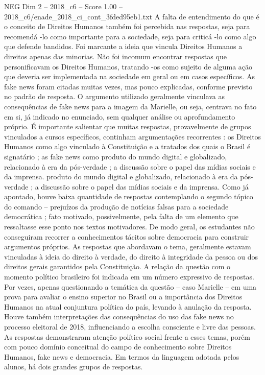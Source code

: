 \begin{textsample}{NEG Dim 2 – 2018\_c6 – Score 1.00 – 2018\_c6/enade\_2018\_ci\_cont\_3fded95eb1.txt}
A falta de entendimento do que é o conceito de Direitos Humanos também foi percebida nas respostas, seja para recomendá -lo como importante para a sociedade, seja para criticá -lo como algo que defende bandidos.
Foi marcante a ideia que vincula Direitos Humanos a direitos apenas das minorias.
Não foi incomum encontrar respostas que personificavam os Direitos Humanos, tratando -os como sujeito de alguma ação que deveria ser implementada na sociedade em geral ou em casos específicos.
As fake news foram citadas muitas vezes, mas pouco explicadas, conforme previsto no padrão de resposta.
O argumento utilizado geralmente vinculava as consequências de fake news para a imagem da Marielle, ou seja, centrava no fato em si, já indicado no enunciado, sem qualquer análise ou aprofundamento próprio.
É importante salientar que muitas respostas, provavelmente de grupos vinculados a cursos específicos, continham argumentações recorrentes : os Direitos Humanos como algo vinculado à Constituição e a tratados dos quais o Brasil é signatário ; as fake news como produto do mundo digital e globalizado, relacionado à era da pós-verdade ; a discussão sobre o papel das mídias sociais e da imprensa. produto do mundo digital e globalizado, relacionado à era da pós-verdade ; a discussão sobre o papel das mídias sociais e da imprensa.
Como já apontado, houve baixa quantidade de respostas contemplando o segundo tópico do comando – prejuízos da produção de notícias falsas para a sociedade democrática ; fato motivado, possivelmente, pela falta de um elemento que ressaltasse esse ponto nos textos motivadores.
De modo geral, os estudantes não conseguiram recorrer a conhecimentos tácitos sobre democracia para construir argumentos próprios.
As respostas que abordavam o tema, geralmente estavam vinculadas à ideia do direito à verdade, do direito à integridade da pessoa ou dos direitos gerais garantidos pela Constituição.
A relação da questão com o momento político brasileiro foi indicada em um número expressivo de respostas.
Por vezes, apenas questionando a temática da questão – caso Marielle – em uma prova para avaliar o ensino superior no Brasil ou a importância dos Direitos Humanos na atual conjuntura política do país, levando à anulação da resposta.
Houve também interpretações das consequências do uso das fake news no processo eleitoral de 2018, influenciando a escolha consciente e livre das pessoas.
As respostas demonstraram atenção político social frente a esses temas, porém com pouco domínio conceitual do campo de conhecimento sobre Direitos Humanos, fake news e democracia.
Em termos da linguagem adotada pelos alunos, há dois grandes grupos de respostas.

\end{textsample}
